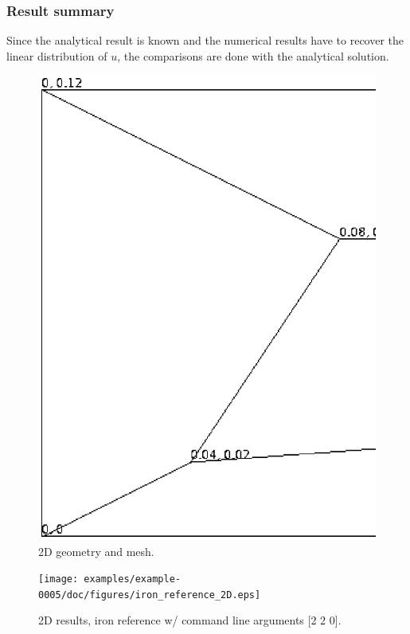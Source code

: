 \subsubsection{Result summary}
%
Since the analytical result is known and the numerical results have to recover the linear distribution of $u$, the comparisons are done with the analytical solution.
%


%
\begin{figure}[h!]
    \centering 
    \includegraphics[width=0.9\columnwidth]{examples/example-0005/doc/figures/2d_mesh.eps} 
    \caption{2D geometry and mesh.}
    \label{3d-mesh-fig}
\end{figure}
%
\begin{figure}[h!]
    \centering 
    \texttt{[image: examples/example-0005/doc/figures/iron\_reference\_2D.eps]} 
    \caption{2D results, iron reference w/ command line arguments [2 2 0].}
    \label{example-0005-iron-2D-reference-fig}
\end{figure}
%
